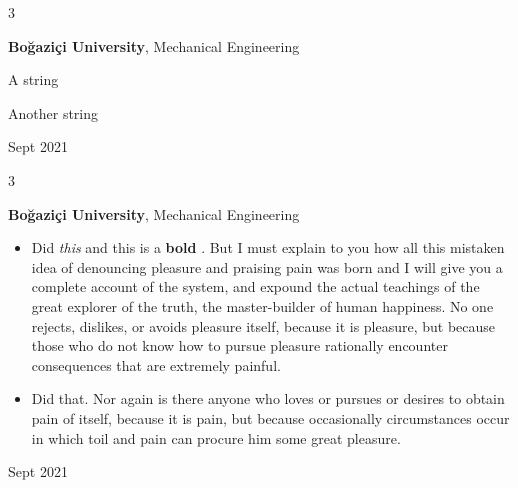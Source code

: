 \documentclass[10pt, letterpaper]{article}
\newenvironment{summary}{
    \begin{description}[
        topsep=0.10 cm,
        parsep=0.10 cm,
        partopsep=0pt,
        itemsep=0pt,
        leftmargin=0.4 cm + 10pt
    ]
}{
    \end{description}
} %
\newenvironment{highlights}{
    \begin{itemize}[
        topsep=0.10 cm,
        parsep=0.10 cm,
        partopsep=0pt,
        itemsep=0pt,
        leftmargin=0.4 cm + 10pt
    ]
}{
    \end{itemize}
} %
\newenvironment{threecolentry}[3][]{
    \onecolentry
    \def\thirdColumn{#3}
    \setcolumnwidth{1 cm, \fill, 4.5 cm}
    \begin{paracol}{3}
    {\raggedright #2} \switchcolumn
}{
    \switchcolumn \raggedleft \thirdColumn
    \end{paracol}
    \endonecolentry
} %
\let\hrefWithoutArrow\href
\renewcommand{\href}[2]{\hrefWithoutArrow{#1}{\ifthenelse{\equal{#2}{}}{ }{#2 }\raisebox{.15ex}{\footnotesize \faExternalLink*}}}
\begin{document}
        \vspace{0.2 cm}

        \begin{threecolentry}{\textbf{}}{
            Sept 2021
        }
            \textbf{Boğaziçi University}, Mechanical Engineering
            \begin{summary}
                \item A string
                \item Another string
            \end{summary}
        \end{threecolentry}

        \vspace{0.2 cm}

        \begin{threecolentry}{\textbf{}}{
            Sept 2021
        }
            \textbf{Boğaziçi University}, Mechanical Engineering
            \begin{highlights}
                \item Did \textit{this} and this is a \textbf{bold} \href{https://example.com}{link}. But I must explain to you how all this mistaken idea of denouncing pleasure and praising pain was born and I will give you a complete account of the system, and expound the actual teachings of the great explorer of the truth, the master-builder of human happiness. No one rejects, dislikes, or avoids pleasure itself, because it is pleasure, but because those who do not know how to pursue pleasure rationally encounter consequences that are extremely painful.
                \item Did that. Nor again is there anyone who loves or pursues or desires to obtain pain of itself, because it is pain, but because occasionally circumstances occur in which toil and pain can procure him some great pleasure.
            \end{highlights}
        \end{threecolentry}

        \vspace{0.2 cm}
\end{document}
